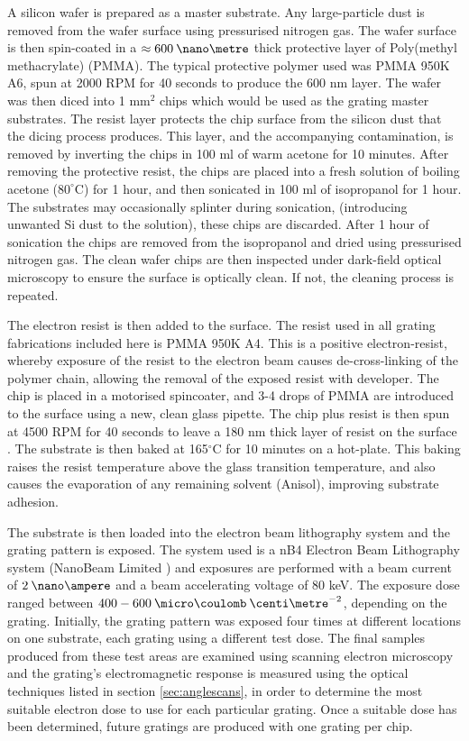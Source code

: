 A silicon wafer is prepared as a master substrate.  Any large-particle dust is removed from the wafer surface using pressurised nitrogen gas. The wafer surface is then spin-coated in a $\approx 600 \:\nano\metre$ thick protective layer of Poly(methyl methacrylate) (PMMA). The typical protective polymer used was PMMA 950K A6, spun at 2000 RPM for 40 seconds to produce the 600 nm layer. 
The wafer was then diced into 1 mm$^2$ chips which would be used as the  grating master substrates. The resist layer protects the chip surface from the silicon dust that the dicing process produces. This layer, and the accompanying contamination, is removed by inverting the chips in  100 ml of warm acetone for 10 minutes. After removing the protective resist, the chips are placed into a fresh solution of boiling acetone ($80^\circ$C) for 1 hour, and then sonicated in 100 ml of isopropanol for 1 hour. The substrates may occasionally splinter during sonication, (introducing unwanted Si dust to the solution), these chips are discarded. After 1 hour of sonication the chips are removed from the isopropanol and dried using pressurised nitrogen gas.
The clean wafer chips are then inspected under dark-field optical microscopy to ensure the surface is optically clean. If not, the cleaning process is repeated.

The electron resist is then added to the surface. The resist used in all grating fabrications included here is PMMA 950K A4. This is a positive electron-resist, whereby exposure of the resist to the electron beam causes de-cross-linking of the polymer chain, allowing the removal of the exposed resist with developer. The chip is placed in a motorised spincoater, and 3-4 drops of PMMA are introduced to the surface using a new, clean glass pipette. The chip plus resist is then spun at 4500 RPM for 40 seconds to leave a 180 nm thick layer of resist on the surface \cite{Pmma}. The substrate is then baked at 165$^\circ$C for 10 minutes on a hot-plate. This baking raises the resist temperature above the glass transition temperature, and also causes the evaporation of any remaining solvent (Anisol), improving substrate adhesion. 

The substrate is then loaded into the electron beam lithography system and the grating pattern is exposed. The system used is a nB4 Electron Beam Lithography system (NanoBeam Limited \cite{Ltd2013}) and exposures are performed with a beam current of ${2 \:\nano\ampere}$ and a beam accelerating voltage of 80 keV. The exposure dose ranged between ${400-600 \:\micro\coulomb\:\centi\metre^{-2}}$, depending on the grating. Initially, the grating pattern was exposed four times at different locations on one substrate, each grating using a different test dose. The final samples produced from these test areas are examined using scanning electron microscopy and the grating's electromagnetic response is measured using the optical techniques listed in section \ref{sec:anglescans}, in order to determine the most suitable electron dose to use for each particular grating. Once a suitable dose has been determined, future gratings are produced with one grating per chip. 

